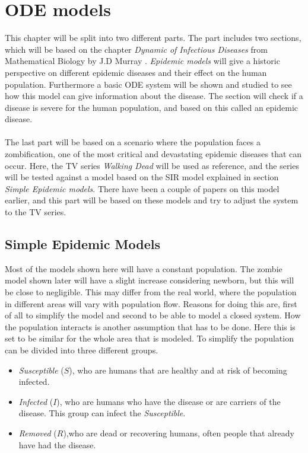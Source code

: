 \documentclass[%
twoside,                 %
final,                   %
chapterprefix=true,      %
open=right               %
10pt]{book}
\begin{document}
\chapter{ODE models}
This chapter will be split into two different parts. The part includes two sections, which will be based on the chapter \emph{Dynamic of Infectious Diseases} from Mathematical Biology by J.D Murray \cite{murray2002mathematical}. \emph{Epidemic models} will give a historic perspective on different epidemic diseases and their effect on the human population. Furthermore a basic ODE system will be shown and studied to see how this model can give information about the disease. The section will check if a disease is severe for the human population, and based on this called an epidemic disease.
\\
\\
The last part will be based on a scenario where the population faces a zombification, one of the most critical and devastating epidemic diseases that can occur. Here, the TV series \emph{Walking Dead} will be used as reference, and the series will be tested against a model based on the SIR model explained in section \emph{Simple Epidemic models}. There have been a couple of papers on this model earlier, and this part will be based on these models and try to adjust the system to the TV series.     
\section{Simple Epidemic Models}
Most of the models shown here will have a constant population. The zombie model shown later will have a slight increase considering newborn, but this will be close to negligible. This may differ from the real world, where the population in different areas will vary with population flow. Reasons for doing this are, first of all to simplify the model and second to be able to model a closed system. How the population interacts is another assumption that has to be done. Here this is set to be similar for the whole area that is modeled. To simplify the population can be divided into three different groups. 
\begin{itemize}
\item \emph{Susceptible} ($S$), who are humans that are healthy and at risk of becoming infected. 

\item \emph{Infected} ($I$), who are humans who have the disease or are carriers of the disease. This group can infect the \emph{Susceptible}. 

\item \emph{Removed} ($R$),who are dead or recovering humans, often people that already have had the disease. 
\end{itemize}
\end{document}
